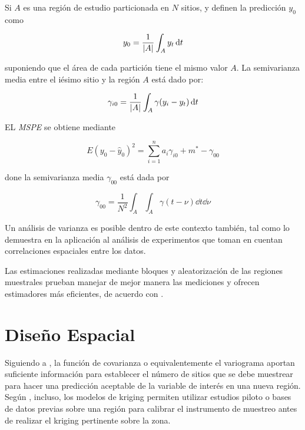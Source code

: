 \documentclass[14pt]{extarticle}
\begin{document}
Si $A$ es una región de estudio  particionada en $N$ sitios, \cite{Thompson.2012} y \cite{Grondona.1991} definen la predicción $y_0$ como

\begin{equation}
	y_0 = \frac{1}{\abs{A}} \int_{A} y_t \dd{t}
\end{equation}

\noindent suponiendo que el área de cada partición tiene el mismo valor $A$. La semivarianza media entre el iésimo sitio y la región $A$ está dado por:

\begin{equation}
	\gamma_{i0} = \frac{1}{\abs{A}} \int_{A}\gamma(y_i - y_t)\dd{t}
\end{equation}

EL \textit{MSPE} se obtiene mediante

\begin{equation}
	E\left(y_0 - \hat{y}_0\right)^2 = \sum_{i=1}^{n} a_i \gamma_{i0} + m^* - \gamma_{00}
\end{equation}

\noindent done la semivarianza media $\gamma_{00}$ está dada por

\begin{equation}
	\gamma_{00} = \frac{1}{N^2} \int_{A}\int_{A}\gamma(t-\nu)\dd{t}\dd{\nu}
\end{equation}

Un análisis de varianza es posible dentro de este contexto también, tal como lo demuestra \cite{Grondona.1991} en la aplicación al análisis de experimentos que toman en cuentan correlaciones espaciales entre los datos. 

Las estimaciones realizadas mediante bloques y aleatorización de las regiones muestrales prueban manejar de mejor manera las mediciones y ofrecen estimadores más eficientes, de acuerdo con \cite{Grondona.1991}. 

\section{Diseño Espacial}
Siguiendo a \cite{Thompson.2012}, la función de covarianza o equivalentemente el variograma aportan suficiente información para establecer el número de sitios que se debe muestrear para hacer una predicción aceptable de la variable de interés en una nueva región. Según \cite{Cressie.1986}, incluso, los modelos de kriging permiten utilizar estudios piloto o bases de datos previas sobre una región para calibrar el instrumento de muestreo antes de realizar el kriging pertinente sobre la zona. 
\end{document}
